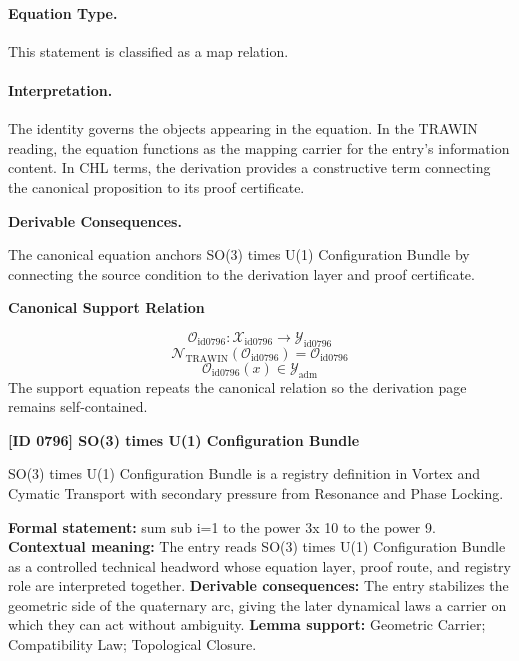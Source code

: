 \paragraph{Equation Type.}
This statement is classified as a map relation.

\paragraph{Interpretation.}
The identity governs the objects appearing in the equation. In the TRAWIN reading, the equation functions as the mapping carrier for the entry’s information content. In CHL terms, the derivation provides a constructive term connecting the canonical proposition to its proof certificate.

\par\vspace{0.35em}
\noindent\textbf{Derivable Consequences.}\quad
\begingroup
\footnotesize
\raggedright
The canonical equation anchors SO(3) times U(1) Configuration Bundle by connecting the source condition to the derivation layer and proof certificate.
\par\endgroup

\noindent\textbf{Canonical Support Relation}\par
\[
\mathcal{O}_{\mathrm{id0796}}:\mathcal{X}_{\mathrm{id0796}}\longrightarrow\mathcal{Y}_{\mathrm{id0796}}
\]
\[
\mathcal{N}_{\mathrm{TRAWIN}}(\mathcal{O}_{\mathrm{id0796}})=\mathcal{O}_{\mathrm{id0796}}
\]
\[
\mathcal{O}_{\mathrm{id0796}}(x)\in\mathcal{Y}_{\mathrm{adm}}
\]
\noindent The support equation repeats the canonical relation so the derivation page remains self-contained.\par

\clearpage
\noindent\textbf{[ID 0796] SO(3) times U(1) Configuration Bundle}\par
\vspace{0.35em}
\begingroup\small
{}
SO(3) times U(1) Configuration Bundle is a registry definition in Vortex and Cymatic Transport with secondary pressure from Resonance and Phase Locking.

\begingroup\footnotesize\setlength{\emergencystretch}{3em}\sloppy
\textbf{Formal statement:} sum sub i=1 to the power 3x 10 to the power 9. \textbf{Contextual meaning:} The entry reads SO(3) times U(1) Configuration Bundle as a controlled technical headword whose equation layer, proof route, and registry role are interpreted together. \textbf{Derivable consequences:} The entry stabilizes the geometric side of the quaternary arc, giving the later dynamical laws a carrier on which they can act without ambiguity. \textbf{Lemma support:} Geometric Carrier; Compatibility Law; Topological Closure.\par
\endgroup

